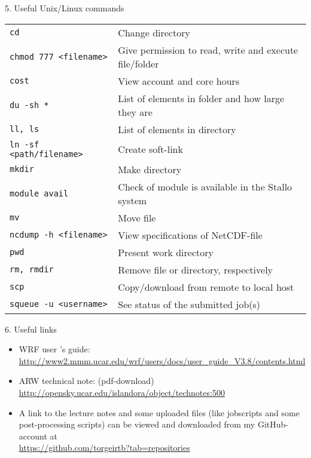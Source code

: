 \documentclass[xcolor=table]{beamer}
\begin{document}
\begin{frame}[fragile]{5. Useful Unix/Linux commands}
\begin{tabular}{p{4.5 cm} p{7	 cm}}
	\texttt{cd}										 & Change directory \\
	\texttt{chmod 777 <filename>} 	& Give permission to read, write and execute file/folder	\\
	\texttt{cost} 				  					& View account and core hours 											  \\
	\texttt{du -sh *} 								& List of elements in folder and how large they are \\
	\texttt{ll, ls}										& List of elements in directory \\
	\texttt{ln -sf <path/filename>}		& Create soft-link \\
	\texttt{mkdir}									& Make directory	\\
	\texttt{module avail}					  &  Check of module is available in the Stallo system 			\\	
	\texttt{mv}										& Move file		\\
	\texttt{ncdump -h <filename>}	& View specifications of NetCDF-file 	\\
	\texttt{pwd}									& Present work directory \\
	\texttt{rm, rmdir}							& Remove file or directory, respectively \\
	\texttt{scp}									 & Copy/download from remote to local host \\
	\texttt{squeue -u <username>}	& See status of the submitted job(s)
\end{tabular}
\end{frame}



\begin{frame}{6. Useful links}
\begin{itemize}
	\item WRF user 's guide:\\
	\url{http://www2.mmm.ucar.edu/wrf/users/docs/user_guide_V3.8/contents.html}\\
	\item ARW technical note: (pdf-download)\\
	\url{http://opensky.ucar.edu/islandora/object/technotes:500}
	\item A link to the lecture notes and some uploaded files (like jobscripts and some post-processing scripts) can be viewed and downloaded from my GitHub-account at \\
	\url{https://github.com/torgeirtb?tab=repositories}
\end{itemize}
\end{frame}
\end{document}
